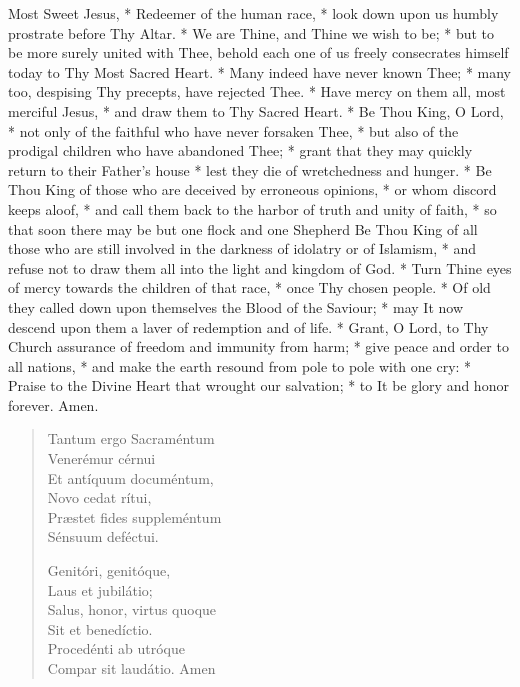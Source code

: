 \documentclass[statementpaper, 11pt]{memoir}
\begin{document}
Most Sweet Jesus, * Redeemer of the human race, * look down
upon us humbly prostrate before Thy Altar. * We are Thine, and Thine we wish to
be; * but to be more surely united with Thee, behold each one of us freely
consecrates himself today to Thy Most Sacred Heart. * Many indeed have never
known Thee; * many too, despising Thy precepts, have rejected Thee. * Have
mercy on them all, most merciful Jesus, * and draw them to Thy Sacred Heart. *
Be Thou King, O Lord, * not only of the faithful who have never forsaken Thee,
* but also of the prodigal children who have abandoned Thee; * grant that they
may quickly return to their Father's house * lest they die of wretchedness and
hunger. * Be Thou King of those who are deceived by erroneous opinions, * or
whom discord keeps aloof, * and call them back to the harbor of truth and unity
of faith, * so that soon there may be but one flock and one Shepherd Be Thou
King of all those who are still involved in the darkness of idolatry or of
Islamism, * and refuse not to draw them all into the light and kingdom of God.
* Turn Thine eyes of mercy towards the children of that race, * once Thy chosen
people. * Of old they called down upon themselves the Blood of the Saviour; *
may It now descend upon them a laver of redemption and of life. * Grant, O
Lord, to Thy Church assurance of freedom and immunity from harm; * give peace
and order to all nations, * and make the earth resound from pole to pole with
one cry: * Praise to the Divine Heart that wrought our salvation; * to It be
glory and honor forever. Amen.


\begin{verse}
    
Tantum ergo Sacram\'entum\\
Vener\'emur c\'ernui\\
Et ant\'iquum docum\'entum,\\
Novo cedat r\'itui,\\
Pr\ae stet fides supplem\'entum\\
S\'ensuum def\'ectui.

Genit\'ori, genit\'oque,\\
Laus et jubil\'atio;\\
Salus, honor, virtus quoque\\
Sit et bened\'ictio.\\
Proced\'enti ab utr\'oque\\
Compar sit laud\'atio. Amen\\

\end{verse}
\end{document}
